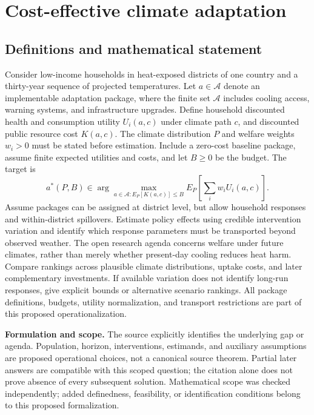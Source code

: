 \documentclass[11pt]{article}
\begin{document}
\section*{Cost-effective climate adaptation}\label{30007715}
\subsection{Definitions and mathematical statement}
Consider low-income households in heat-exposed districts of one country and a thirty-year sequence of projected temperatures. Let \(a\in\mathcal A\) denote an implementable adaptation package, where the finite set \(\mathcal A\) includes cooling access, warning systems, and infrastructure upgrades. Define household discounted health and consumption utility \(U_i(a,c)\) under climate path \(c\), and discounted public resource cost \(K(a,c)\). The climate distribution \(P\) and welfare weights \(w_i>0\) must be stated before estimation. Include a zero-cost baseline package, assume finite expected utilities and costs, and let \(B\geq0\) be the budget. The target is
\[a^*(P,B)\in\arg\max_{a\in\mathcal A:E_P[K(a,c)]\leq B}E_P\!\left[\sum_i w_iU_i(a,c)\right].\]
Assume packages can be assigned at district level, but allow household responses and within-district spillovers. Estimate policy effects using credible intervention variation and identify which response parameters must be transported beyond observed weather. The open research agenda concerns welfare under future climates, rather than merely whether present-day cooling reduces heat harm. Compare rankings across plausible climate distributions, uptake costs, and later complementary investments. If available variation does not identify long-run responses, give explicit bounds or alternative scenario rankings. All package definitions, budgets, utility normalization, and transport restrictions are part of this proposed operationalization.

\par\textbf{Formulation and scope.} The source explicitly identifies the underlying gap or agenda. Population, horizon, interventions, estimands, and auxiliary assumptions are proposed operational choices, not a canonical source theorem. Partial later answers are compatible with this scoped question; the citation alone does not prove absence of every subsequent solution. Mathematical scope was checked independently; added definedness, feasibility, or identification conditions belong to this proposed formalization.
\end{document}
